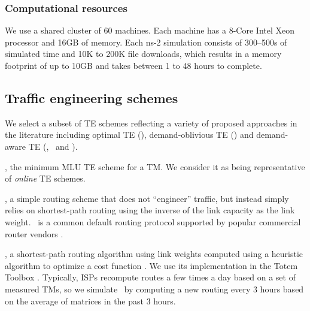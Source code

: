 \subsubsection{Computational resources}
We use a shared cluster of 60 machines. Each machine has a 8-Core Intel Xeon processor and 16GB of memory. Each ns-2 simulation consists of 300--500s of simulated time and 10K to 200K file downloads, which results in a memory footprint of up to 10GB and takes between 1 to 48 hours to complete.

\subsection{Traffic engineering schemes} We select a subset of TE schemes reflecting a variety of proposed approaches in the literature including optimal TE (\opt), demand-oblivious TE (\invcap) and demand-aware TE (\optwt, \mplsavg\ and \cope).

{\bf{\opt}}, the minimum MLU TE scheme for a TM. We consider it as being representative of {\em online} TE schemes.


{\bf{\invcap}}, a simple routing scheme that does not ``engineer'' traffic, but instead  simply relies on shortest-path routing using the inverse of the link capacity as the link weight. \invcap\ is a common default routing protocol supported by popular commercial router vendors \cite{InvCapCite}.

{\bf{\optwt}},  a shortest-path routing algorithm using link weights computed using a heuristic algorithm to optimize a cost function \cite{fortz2000internet}. We use its implementation in the Totem Toolbox \cite{TotemData}. Typically, ISPs recompute routes a few times a day based on a set of measured TMs, so we simulate \optwt\ by computing a new routing every 3 hours based on the average of matrices in the past 3 hours.


